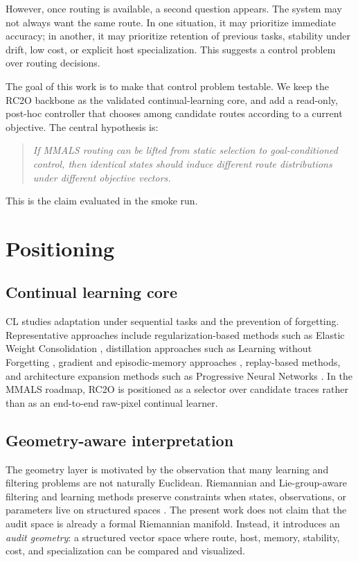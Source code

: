 \documentclass[11pt,a4paper]{article}
\begin{document}
However, once routing is available, a second question appears. The system may not always want the same route. In one situation, it may prioritize immediate accuracy; in another, it may prioritize retention of previous tasks, stability under drift, low cost, or explicit host specialization. This suggests a control problem over routing decisions.

The goal of this work is to make that control problem testable. We keep the RC2O backbone as the validated continual-learning core, and add a read-only, post-hoc controller that chooses among candidate routes according to a current objective. The central hypothesis is:

\begin{quote}
\emph{If MMALS routing can be lifted from static selection to goal-conditioned control, then identical states should induce different route distributions under different objective vectors.}
\end{quote}

This is the claim evaluated in the smoke run.

\section{Positioning}
\subsection{Continual learning core}
CL studies adaptation under sequential tasks and the prevention of forgetting. Representative approaches include regularization-based methods such as Elastic Weight Consolidation \cite{kirkpatrick2017ewc}, distillation approaches such as Learning without Forgetting \cite{li2016lwf}, gradient and episodic-memory approaches \cite{lopezpaz2017gem}, replay-based methods, and architecture expansion methods such as Progressive Neural Networks \cite{rusu2016pnn}. In the MMALS roadmap, RC2O is positioned as a selector over candidate traces rather than as an end-to-end raw-pixel continual learner.

\subsection{Geometry-aware interpretation}
The geometry layer is motivated by the observation that many learning and filtering problems are not naturally Euclidean. Riemannian and Lie-group-aware filtering and learning methods preserve constraints when states, observations, or parameters live on structured spaces \cite{labsir2026filtering}. The present work does not claim that the audit space is already a formal Riemannian manifold. Instead, it introduces an \emph{audit geometry}: a structured vector space where route, host, memory, stability, cost, and specialization can be compared and visualized.
\end{document}
